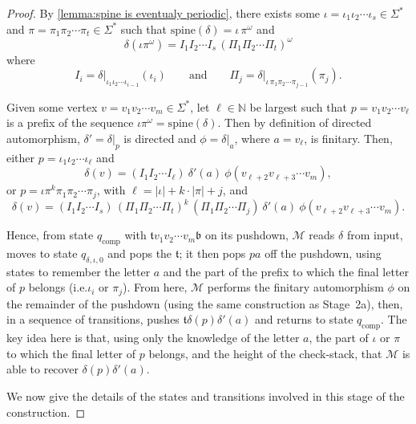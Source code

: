 \begin{proof}
	
	By \cref{lemma:spine is eventualy periodic}, there exists some $\iota = \iota_1 \iota_2 \cdots \iota_s \in \Sigma^*$ and $\pi = \pi_1 \pi_2 \cdots \pi_t \in \Sigma^*$ such that
	$
	\mathrm{spine}(\delta)
	=
	\iota \, \pi^\omega
	$
	and
	\[
	\delta(\iota\pi^\omega)
	=
	I_1 I_2 \cdots I_s
	\,
	\left( \Pi_1 \Pi_2 \cdots \Pi_t \right)^\omega
	\]
	where
	\[
	I_i
	=
	\left. \delta \right\vert_{\iota_1 \iota_2 \cdots \iota_{i-1}} (\iota_i)
	\qquad
	\text{and}
	\qquad
	\Pi_j
	=
	\left. \delta \right\vert_{\iota \, \pi_1 \pi_2 \cdots \pi_{j-1}}\!(\pi_j).
	\]
	
	Given some vertex $v = v_1 v_2 \cdots v_m \in \Sigma^*$, let $\ell \in \mathbb{N}$ be largest such that $p = v_1 v_2 \cdots v_\ell$ is a prefix of the sequence $\iota\pi^\omega = \mathrm{spine}(\delta)$.
	Then by  definition of directed automorphism, $\delta' = \delta\vert_p$ is directed and $\phi = \delta\vert_a$, where $a = v_{\ell}$, is finitary.
	Then, either $p = \iota_1 \iota_2 \cdots \iota_\ell$ and 
	\[
	\delta(v)
	=
	(I_1 I_2 \cdots I_\ell)
	\ 
	\delta'(a)
	\ 
	\phi(v_{\ell+2} v_{\ell+3} \cdots v_m),
	\]
	or $p = \iota\pi^k\pi_1\pi_2\cdots\pi_j$, with $\ell = |\iota|+k\cdot|\pi| + j$, and 
	\[
	\delta(v)
	=
	(I_1 I_2 \cdots I_s)
	\,
	(\Pi_1 \Pi_2 \cdots \Pi_t)^k
	\,
	(\Pi_1 \Pi_2 \cdots \Pi_j)
	\ 
	\delta'(a)
	\ 
	\phi( v_{\ell+2} v_{\ell+3} \cdots v_m).
	\]
	
	Hence, from state $q_\mathrm{comp}$ with $\mathfrak{t} v_1 v_2 \cdots v_m \mathfrak{b}$ on its pushdown, $\mathcal M$ reads $\delta$ from input, moves to state $q_{\delta,\iota,0}$ and pops the $\mathfrak{t}$;
	it then pops $pa$ off the pushdown, using states to remember the letter $a$ and the part of the prefix to which the final letter of $p$ belongs (i.e.\@ $\iota_i$ or $\pi_j$).
	From here, $\mathcal{M}$ performs the finitary automorphism $\phi$ on the remainder of the pushdown (using the same construction as Stage~2a), then, in a sequence of transitions, pushes $\mathfrak{t}\delta(p)\delta'(a)$ and returns to state $q_\mathrm{comp}$.
	The key idea here is that, using only the knowledge of the letter $a$, the part of $\iota$ or $\pi$ to which the final letter of $p$ belongs, and the height of the check-stack, that $\mathcal M$ is able to recover $\delta(p)\delta'(a)$.
	
	We now give the details of the states and transitions involved in this stage of the construction.
	

\end{proof}
